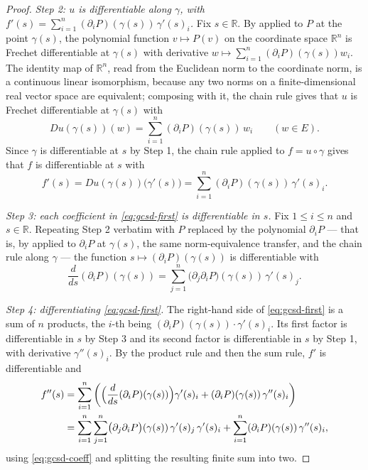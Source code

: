 \begin{proof}
\emph{Step 2: $u$ is differentiable along $\gamma$, with
$f'(s)=\sum_{i=1}^{n}(\partial_iP)(\gamma(s))\,\gamma'(s)_i$.} Fix
$s\in\mathbb{R}$. By  applied to $P$ at the point
$\gamma(s)$, the polynomial function $v\mapsto P(v)$ on the coordinate space
$\mathbb{R}^n$ is Frechet differentiable at $\gamma(s)$ with derivative
$w\mapsto\sum_{i=1}^{n}(\partial_iP)(\gamma(s))w_i$. The identity map of
$\mathbb{R}^n$, read from the Euclidean norm to the coordinate norm, is a
continuous linear isomorphism, because any two norms on a finite-dimensional
real vector space are equivalent; composing with it, the chain rule gives that
$u$ is Frechet differentiable at $\gamma(s)$ with
\[
  Du(\gamma(s))(w)=\sum_{i=1}^{n}(\partial_iP)(\gamma(s))\,w_i\qquad(w\in E).
\]
Since $\gamma$ is differentiable at $s$ by Step 1, the chain rule applied to
$f=u\circ\gamma$ gives that $f$ is differentiable at $s$ with
\begin{equation}\label{eq:gcsd-first}
  f'(s)=Du(\gamma(s))\bigl(\gamma'(s)\bigr)
      =\sum_{i=1}^{n}(\partial_iP)(\gamma(s))\,\gamma'(s)_i .
\end{equation}

\emph{Step 3: each coefficient in \eqref{eq:gcsd-first} is differentiable in
$s$.} Fix $1\le i\le n$ and $s\in\mathbb{R}$. Repeating Step 2 verbatim with $P$
replaced by the polynomial $\partial_iP$ --- that is, by 
applied to $\partial_iP$ at $\gamma(s)$, the same norm-equivalence transfer, and
the chain rule along $\gamma$ --- the function $s\mapsto(\partial_iP)(\gamma(s))$
is differentiable with
\begin{equation}\label{eq:gcsd-coeff}
  \frac{d}{ds}(\partial_iP)(\gamma(s))
  =\sum_{j=1}^{n}\bigl(\partial_j\partial_iP\bigr)(\gamma(s))\,\gamma'(s)_j .
\end{equation}

\emph{Step 4: differentiating \eqref{eq:gcsd-first}.} The right-hand side of
\eqref{eq:gcsd-first} is a sum of $n$ products, the $i$-th being
$(\partial_iP)(\gamma(s))\cdot\gamma'(s)_i$. Its first factor is differentiable
in $s$ by Step 3 and its second factor is differentiable in $s$ by Step 1, with
derivative $\gamma''(s)_i$. By the product rule and then the sum rule, $f'$ is
differentiable and
\begin{align*}
  f''(s)&=\sum_{i=1}^{n}\left(
      \Bigl(\frac{d}{ds}(\partial_iP)(\gamma(s))\Bigr)\gamma'(s)_i
      +(\partial_iP)(\gamma(s))\,\gamma''(s)_i\right)\\
   &=\sum_{i=1}^{n}\sum_{j=1}^{n}
       \bigl(\partial_j\partial_iP\bigr)(\gamma(s))\,\gamma'(s)_j\,\gamma'(s)_i
     +\sum_{i=1}^{n}(\partial_iP)(\gamma(s))\,\gamma''(s)_i ,
\end{align*}
using \eqref{eq:gcsd-coeff} and splitting the resulting finite sum into two.


\end{proof}
